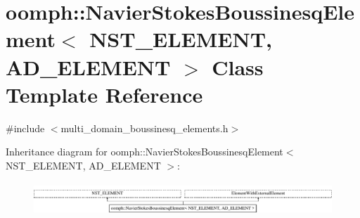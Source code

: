 \hypertarget{classoomph_1_1NavierStokesBoussinesqElement}{}\section{oomph\+:\+:Navier\+Stokes\+Boussinesq\+Element$<$ N\+S\+T\+\_\+\+E\+L\+E\+M\+E\+NT, A\+D\+\_\+\+E\+L\+E\+M\+E\+NT $>$ Class Template Reference}
\label{classoomph_1_1NavierStokesBoussinesqElement}


{\ttfamily \#include $<$multi\+\_\+domain\+\_\+boussinesq\+\_\+elements.\+h$>$}

Inheritance diagram for oomph\+:\+:Navier\+Stokes\+Boussinesq\+Element$<$ N\+S\+T\+\_\+\+E\+L\+E\+M\+E\+NT, A\+D\+\_\+\+E\+L\+E\+M\+E\+NT $>$\+:\begin{figure}[H]
\begin{center}
\leavevmode
\includegraphics[height=1.244444cm]{classoomph_1_1NavierStokesBoussinesqElement}
\end{center}
\end{figure}
